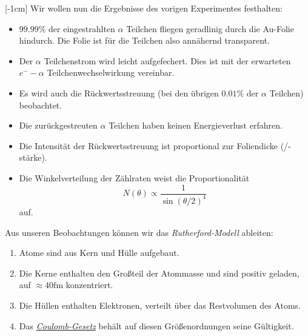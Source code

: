 \documentclass{subfiles}
\begin{document}
    [-1cm]
    \noindent Wir wollen nun die Ergebnisse des vorigen Experimentes festhalten:
    \begin{itemize}
        \item $99.99\si\percent$ der eingestrahlten $\alpha$ Teilchen fliegen geradlinig durch die Au-Folie hindurch. Die Folie ist für die Teilchen also annähernd transparent. 
        \item Der $\alpha$ Teilchenstrom wird leicht aufgefechert. Dies ist mit der erwarteten $e^--\alpha$ Teilchenwechselwirkung vereinbar.
        \item Es wird auch die Rückwertsstreuung (bei den übrigen $0.01\si\percent$ der $\alpha$ Teilchen) beobachtet.
        \item Die zurückgestreuten $\alpha$ Teilchen haben keinen Energieverlust erfahren.
        \item Die Intensität der Rückwertsstreuung ist proportional zur Foliendicke (/-stärke).
        \item Die Winkelverteilung der Zählraten weist die Proportionalität
        \[N(\theta) \propto \frac{1}{\sin(\theta/2)^4}\]
        auf. 
    \end{itemize}
    Aus unseren Beobachtungen können wir das \emph{Rutherford-Modell} ableiten:
    \begin{enumerate}[label=(\roman*)]
        \item Atome sind aus Kern und Hülle aufgebaut.
        \item Die Kerne enthalten den Großteil der Atommasse und sind positiv geladen, auf $\approx 40\si{\femto\metre}$ konzentriert.
        \item Die Hüllen enthalten Elektronen, verteilt über das Restvolumen des Atoms.
        \item Das \href{https://de.wikipedia.org/wiki/Coulombsches_Gesetz}{\emph{Coulomb-Gesetz}} behält auf diesen Größenordnungen seine Gültigkeit.
    \end{enumerate}
\end{document}
